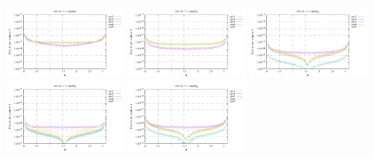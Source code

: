 \noindent
\includegraphics[width=3.5cm]{python_codes/fieldstone_152/RESULTS/exp1/sr2_32_m2}
\includegraphics[width=3.5cm]{python_codes/fieldstone_152/RESULTS/exp1/sr2_32_m3}
\includegraphics[width=3.5cm]{python_codes/fieldstone_152/RESULTS/exp1/sr2_32_m4}
\includegraphics[width=3.5cm]{python_codes/fieldstone_152/RESULTS/exp1/sr2_32_m5}
\includegraphics[width=3.5cm]{python_codes/fieldstone_152/RESULTS/exp1/sr2_32_m6}

